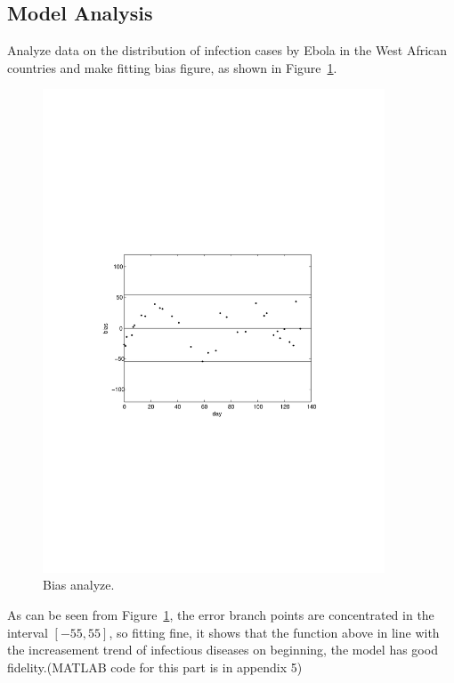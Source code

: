 \subsection{Model Analysis}
Analyze data on the distribution of infection cases by Ebola 
in the West African countries and make fitting bias figure, as
shown in Figure~\ref{fig:6}.\\
\begin{figure}
\centering
\includegraphics[width=4in]{imgs/cases_fit_bias.pdf}
\caption{Bias analyze.}
\label{fig:6}
\end{figure}
As can be seen from Figure~\ref{fig:6}, the error branch points are
concentrated in the interval $[-55,55]$, so fitting fine,
it shows that the function above in line with the increasement
trend of infectious diseases on beginning, the model has good
fidelity.(MATLAB code for this part is in appendix 5)
